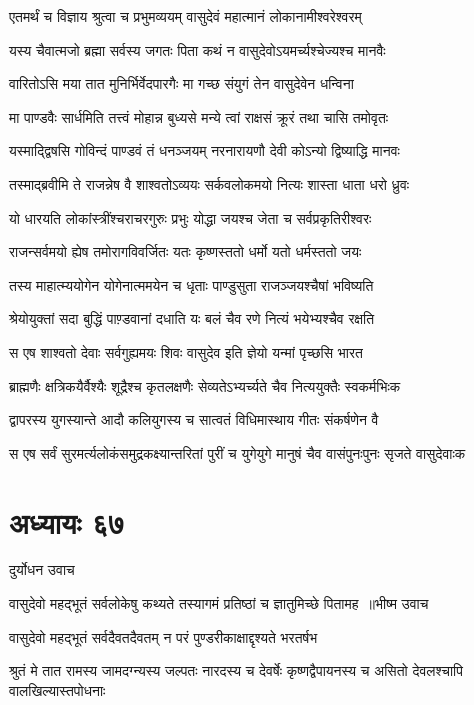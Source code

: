 \twolineshloka
{एतमर्थं च विज्ञाय श्रुत्वा च प्रभुमव्ययम्}
{वासुदेवं महात्मानं लोकानामीश्वरेश्वरम्}


\twolineshloka
{यस्य चैवात्मजो ब्रह्मा सर्वस्य जगतः पिता}
{कथं न वासुदेवोऽयमर्च्यश्चेज्यश्च मानवैः}


\twolineshloka
{वारितोऽसि मया तात मुनिर्भिर्वेदपारगैः}
{मा गच्छ संयुगं तेन वासुदेवेन धन्विना}


\twolineshloka
{मा पाण्डवैः सार्धमिति तत्त्वं मोहान्न बुध्यसे}
{मन्ये त्वां राक्षसं क्रूरं तथा चासि तमोवृतः}


\twolineshloka
{यस्माद्द्विषसि गोविन्दं पाण्डवं तं धनञ्जयम्}
{नरनारायणौ देवी कोऽन्यो द्विष्याद्धि मानवः}


\twolineshloka
{तस्माद्ब्रवीमि ते राजन्नेष वै शाश्वतोऽव्ययः}
{सर्कवलोकमयो नित्यः शास्ता धाता धरो ध्रुवः}


\twolineshloka
{यो धारयति लोकांस्त्रींश्चराचरगुरुः प्रभुः}
{योद्धा जयश्च जेता च सर्वप्रकृतिरीश्वरः}


\twolineshloka
{राजन्सर्वमयो ह्येष तमोरागविवर्जितः}
{यतः कृष्णस्ततो धर्मो यतो धर्मस्ततो जयः}


\twolineshloka
{तस्य माहात्म्ययोगेन योगेनात्ममयेन च}
{धृताः पाण्डुसुता राजञ्जयश्चैषां भविष्यति}


\twolineshloka
{श्रेयोयुक्तां सदा बुद्धिं पाण़्डवानां दधाति यः}
{बलं चैव रणे नित्यं भयेभ्यश्चैव रक्षति}


\twolineshloka
{स एष शाश्वतो देवाः सर्वगुह्यमयः शिवः}
{वासुदेव इति ज्ञेयो यन्मां पृच्छसि भारत}


\twolineshloka
{ब्राह्मणैः क्षत्रिकयैर्वैश्यैः शूद्रैश्च कृतलक्षणैः}
{सेव्यतेऽभ्यर्च्यते चैव नित्ययुक्तैः स्वकर्मभिःक}


\twolineshloka
{द्वापरस्य युगस्यान्ते आदौ कलियुगस्य च}
{सात्वतं विधिमास्थाय गीतः संकर्षणेन वै}


\twolineshloka
{स एष सर्वं सुरमर्त्यलोकंसमुद्रकक्ष्यान्तरितां पुरीं च}
{युगेयुगे मानुषं चैव वासंपुनःपुनः सृजते वासुदेवाःक}


\chapter{अध्यायः ६७}
\twolineshloka
{दुर्योधन उवाच}
{}


\threelineshloka
{वासुदेवो महद्भूतं सर्वलोकेषु कथ्यते}
{तस्यागमं प्रतिष्ठां च ज्ञातुमिच्छे पितामह ॥भीष्म उवाच}
{}


\twolineshloka
{वासुदेवो महद्भूतं सर्वदैवतदैवतम्}
{न परं पुण्डरीकाक्षाद्दृश्यते भरतर्षभ}


\threelineshloka
{श्रुतं मे तात रामस्य जामदग्न्यस्य जल्पतः}
{नारदस्य च देवर्षेः कृष्णद्वैपायनस्य च}
{असितो देवलश्चापि वालखिल्यास्तपोधनाः}


